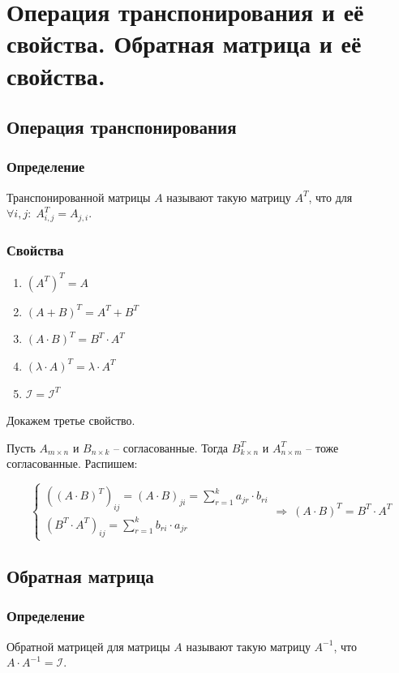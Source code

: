 \documentclass{article}
\begin{document}
\section{Операция транспонирования и её свойства. Обратная матрица и её свойства.}
\subsection{Операция транспонирования}
\subsubsection{Определение}
Транспонированной матрицы $A$ называют такую матрицу $A^T$, что для $\forall i, j:\; A^T_{i, j} = A_{j, i}$.
\subsubsection{Свойства}
\begin{enumerate}
    \item $(A^T)^T=A$
    \item $(A+B)^T=A^T+B^T$
    \item $(A\cdot B)^T=B^T\cdot A^T$
    \item $(\lambda\cdot A)^T=\lambda\cdot A^T$
    \item $\mathcal{I} = \mathcal{I}^T$
\end{enumerate}
Докажем третье свойство.

Пусть $A_{m\times n}$ и $B_{n\times k}$ -- согласованные. Тогда $B^T_{k\times n}$ и $A^T_{n\times m}$ -- тоже согласованные. Распишем:

$$ \begin{cases} ((A\cdot B)^T)_{ij}=(A\cdot B)_{ji}=\sum\limits_{r=1}^k a_{jr}\cdot b_{ri} \\ (B^T\cdot A^T)_{ij} = \sum\limits_{r=1}^k b_{ri}\cdot a_{jr} \end{cases} \Rightarrow\: (A\cdot B)^T = B^T\cdot A^T $$

\subsection{Обратная матрица}
\subsubsection{Определение}
Обратной матрицей для матрицы $A$ называют такую матрицу $A^{-1}$, что $A\cdot A^{-1} = \mathcal{I}$.
\end{document}
